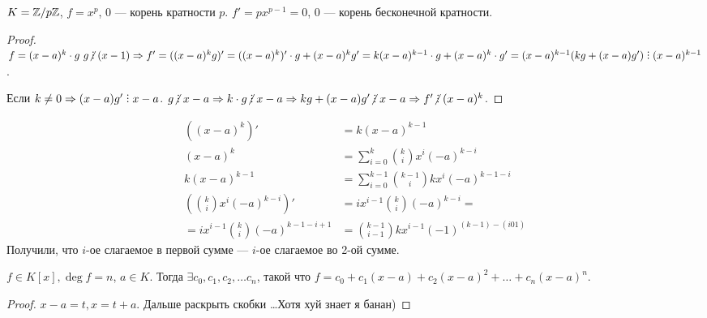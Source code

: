  \begin{example}
     $K = \mathbb{Z} / p\mathbb{Z}$,  $f = x^p$, 0 --- корень кратности  $p$.  $f' = p x^{p-1} = 0$, $0$ --- корень бесконечной кратности.
\end{example}
\begin{proof}
    $f = (x-a)^k \cdot g\ g \centernot \divby (x-1) \Rightarrow f' = ((x-a)^k g)' = ((x-a)^k)' \cdot g + (x-a)^k g' = k(x-a)^{k-1} \cdot g + (x-a)^k \cdot g' = (x-a)^{k-1} (kg + (x-a)g') \divby (x-a)^{k-1}$. 

    Если $k \neq 0 \Rightarrow (x-a)g' \divby x-a$. $g \centernot \divby x-a \Rightarrow k \cdot g \centernot \divby x-a \Rightarrow kg + (x-a)g' \centernot \divby x-a \Rightarrow f' \centernot \divby (x-a)^k$. 
\end{proof}
\begin{lemma}
    \begin{align*}    
        ((x-a)^k)' &= k(x-a)^{k-1}\\
        (x-a)^k &= \sum_{i=0}^k \binom{k}{i} x^i (-a)^{k-i} \\
        k(x-a)^{k-1} &= \sum_{i=0}^{k-1} \binom{k-1}{i} kx^i(-a)^{k-1-i}\\
        (\binom{k}{i} x^i(-a)^{k-i})' &= ix^{i-1} \binom{k}{i} (-a)^{k-i} = \\
        = i x^{i-1} \binom{k}{i}(-a)^{k-1 - i + 1} &= \binom{k-1}{i-1}kx^{i-1}(-1)^{(k-1) - (i 0 1)}
    \end{align*}
    Получили, что $i$-ое слагаемое в первой сумме --- $i$-ое слагаемое во 2-ой сумме.
\end{lemma}
\begin{statement}
    $f \in K[x], \deg f = n$,  $a \in K$. Тогда  $\exists c_0, c_1,c_2,\ldots c_n$, такой что $f = c_0 + c_1(x-a) + c_2(x-a)^2 + \ldots + c_n(x-a)^n$.
\end{statement}
\begin{proof}
    $x-a = t, x = t+a$. Дальше раскрыть скобки \ldots Хотя хуй знает я банан)
\end{proof}
